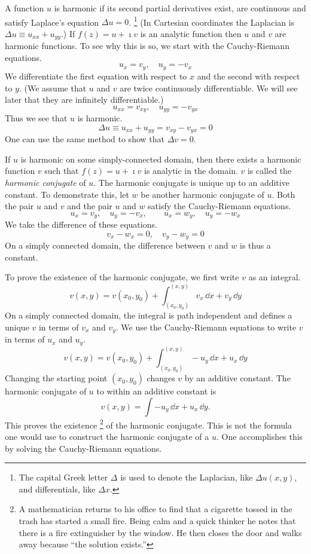

A function $u$ is harmonic if its second partial derivatives
exist, are continuous and satisfy Laplace's equation $\Delta u = 0$.%
\footnote{
  The capital Greek letter $\Delta$ is used to denote the Laplacian, like
  $\Delta u(x,y)$, and differentials, like $\Delta x$.
  }
(In Cartesian coordinates the Laplacian is $\Delta u \equiv u_{x x} + u_{yy}$.) 
If $f(z) = u + \imath v$ is an analytic function then $u$ and $v$
are harmonic functions.  To see why this is so, we start with the 
Cauchy-Riemann equations.
\[
u_x = v_y,\quad u_y = -v_x
\]
We differentiate the first equation with respect to $x$ and the second with
respect to $y$.  (We assume that $u$ and $v$ are twice continuously 
differentiable.  We will see later that they are infinitely differentiable.)
\[
u_{xx} = v_{xy},\quad u_{yy} = -v_{yx}
\]
Thus we see that $u$ is harmonic.
\[
\Delta u \equiv u_{xx} + u_{yy} = v_{xy} - v_{yx} = 0
\]
One can use the same method to show that $\Delta v = 0$.


If $u$ is harmonic on some simply-connected domain, then there exists
a harmonic function $v$ such that $f(z) = u + \imath v$ is analytic in the
domain.  $v$ is called the \textit{harmonic conjugate} of $u$.
The harmonic conjugate is unique up to an additive constant.
To demonstrate this, let $w$ be another harmonic conjugate of $u$.
Both the pair $u$ and $v$ and the pair $u$ and $w$ satisfy the 
Cauchy-Riemann equations.
\[
u_x = v_y, \quad u_y = - v_x, \qquad
u_x = w_y, \quad u_y = - w_x
\]
We take the difference of these equations.
\[
v_x - w_x = 0, \quad v_y - w_y = 0
\]
On a simply connected domain, the difference between $v$ and $w$ is thus
a constant.

To prove the existence of the harmonic conjugate, we first write $v$ as 
an integral.
\[
v(x,y) = v \left( x_0, y_0 \right) + \int_{(x_0,y_0)}^{(x,y)} v_x \,\dd x + v_y \,\dd y
\]
On a simply connected domain, the integral is path independent and defines a 
unique $v$ in terms of $v_x$ and $v_y$.  We use the Cauchy-Riemann equations
to write $v$ in terms of $u_x$ and $u_y$.
\[
v(x,y) = v \left( x_0, y_0 \right) + \int_{(x_0,y_0)}^{(x,y)} - u_y \,\dd x + u_x \,\dd y
\]
Changing the starting point $\left( x_0, y_0 \right)$ changes $v$ by an additive 
constant.  The harmonic conjugate of $u$ to within an additive constant is
\[
v(x,y) = \int - u_y \,\dd x + u_x \,\dd y.
\]
This proves the existence%
\footnote{
  A mathematician returns to his office to find that a cigarette tossed in the
  trash has started a small fire.  Being calm and a quick thinker he notes 
  that there is a fire extinguisher by the window.  He then closes the door 
  and walks away because ``the solution exists.''
  }
of the harmonic conjugate.  This is not the formula
one would use to construct the harmonic conjugate of a $u$.  One accomplishes
this by solving the Cauchy-Riemann equations.




